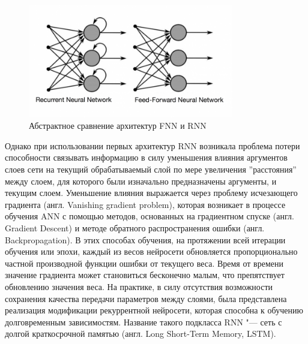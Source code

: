 \documentclass[bachelor, och, coursework]{SCWorks}
\begin{document}
        \begin{figure}[H]
            \centering
            \includegraphics[width=0.8\textwidth]{pics/rnn-vs-fnn.png}
            \caption{Абстрактное сравнение архитектур FNN и RNN}
        \end{figure}

        Однако при использовании первых архитектур RNN возникала проблема потери способности связывать информацию в силу
        уменьшения влияния аргументов слоев сети на текущий обрабатываемый слой по мере увеличения ''расстояния'' между
        слоем, для которого были изначально предназначены аргументы, и текущим слоем. Уменьшение влияния выражается
        через проблему исчезающего градиента (англ. Vanishing gradient problem), которая возникает в процессе обучения
        ANN с помощью методов, основанных на градиентном спуске (англ. Gradient Descent) и методе обратного
        распространения ошибки (англ. Backpropagation). В этих способах обучения, на протяжении всей итерации обучения
        или эпохи, каждый из весов нейросети обновляется пропорционально частной производной функции ошибки от текущего
        веса. Время от времени значение градиента может становиться бесконечно малым, что препятствует обновлению
        значения веса. На практике, в силу отсутствия возможности сохранения качества передачи параметров между слоями,
        была представлена реализация модификации рекуррентной нейросети, которая способна к обучению долговременным
        зависимостям. Название такого подкласса RNN "--- сеть с долгой краткосрочной памятью (англ. Long Short-Term
        Memory, LSTM).
\end{document}

